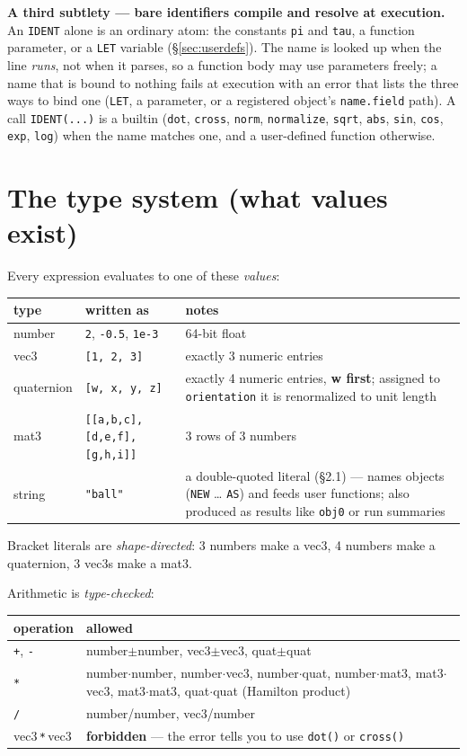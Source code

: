 \documentclass[11pt]{article}
\newcommand{\kw}[1]{\texttt{\uppercase{#1}}}
\newcommand{\code}[1]{\texttt{#1}}
\begin{document}
\textbf{A third subtlety --- bare identifiers compile and resolve at
execution.} An \code{IDENT} alone is an ordinary atom: the constants
\code{pi} and \code{tau}, a function parameter, or a \kw{let}
variable (\S\ref{sec:userdefs}). The name is looked up when the line
\emph{runs}, not when it parses, so a function body may use
parameters freely; a name that is bound to nothing fails at execution
with an error that lists the three ways to bind one (\kw{let}, a
parameter, or a registered object's \code{name.field} path). A call
\code{IDENT(...)} is a builtin (\code{dot}, \code{cross},
\code{norm}, \code{normalize}, \code{sqrt}, \code{abs}, \code{sin},
\code{cos}, \code{exp}, \code{log}) when the name matches one, and a
user-defined function otherwise.

\section{The type system (what values exist)}

Every expression evaluates to one of these \emph{values}:

\begin{center}
\begin{tabular}{llp{7.2cm}}
\textbf{type} & \textbf{written as} & \textbf{notes}\\\hline
number & \code{2}, \code{-0.5}, \code{1e-3} & 64-bit float\\
vec3 & \code{[1, 2, 3]} & exactly 3 numeric entries\\
quaternion & \code{[w, x, y, z]} & exactly 4 numeric entries, \textbf{w first}; assigned to \code{orientation} it is renormalized to unit length\\
mat3 & \code{[[a,b,c],[d,e,f],[g,h,i]]} & 3 rows of 3 numbers\\
string & \code{"ball"} & a double-quoted literal (\S2.1) --- names objects (\kw{new} \ldots{} \kw{as}) and feeds user functions; also produced as results like \code{obj0} or run summaries\\
\end{tabular}
\end{center}

Bracket literals are \emph{shape-directed}: 3 numbers make a vec3,
4 numbers make a quaternion, 3 vec3s make a mat3.

Arithmetic is \emph{type-checked}:
\begin{center}
\begin{tabular}{lp{9.5cm}}
\textbf{operation} & \textbf{allowed}\\\hline
\code{+}, \code{-} & number$\pm$number, vec3$\pm$vec3, quat$\pm$quat\\
\code{*} & number$\cdot$number, number$\cdot$vec3, number$\cdot$quat, number$\cdot$mat3, mat3$\cdot$vec3, mat3$\cdot$mat3, quat$\cdot$quat (Hamilton product)\\
\code{/} & number/number, vec3/number\\
vec3\,\code{*}\,vec3 & \textbf{forbidden} --- the error tells you to use \code{dot()} or \code{cross()}\\
\end{tabular}
\end{center}
\end{document}
